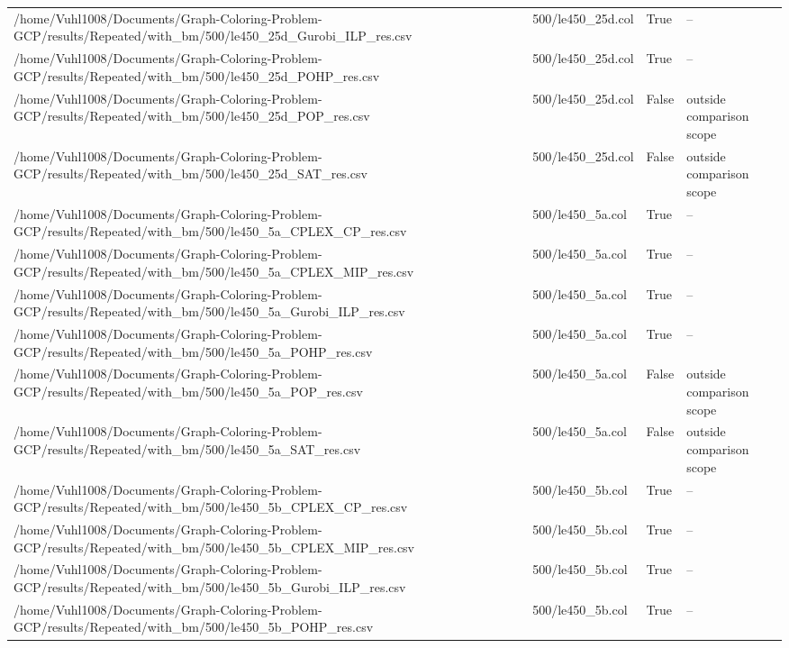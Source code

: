 \begin{table}[htbp]
\begin{tabular}{llll}
/home/Vuhl1008/Documents/Graph-Coloring-Problem-GCP/results/Repeated/with\_bm/500/le450\_25d\_Gurobi\_ILP\_res.csv & 500/le450\_25d.col & True & -- \\
/home/Vuhl1008/Documents/Graph-Coloring-Problem-GCP/results/Repeated/with\_bm/500/le450\_25d\_POHP\_res.csv & 500/le450\_25d.col & True & -- \\
/home/Vuhl1008/Documents/Graph-Coloring-Problem-GCP/results/Repeated/with\_bm/500/le450\_25d\_POP\_res.csv & 500/le450\_25d.col & False & outside comparison scope \\
/home/Vuhl1008/Documents/Graph-Coloring-Problem-GCP/results/Repeated/with\_bm/500/le450\_25d\_SAT\_res.csv & 500/le450\_25d.col & False & outside comparison scope \\
/home/Vuhl1008/Documents/Graph-Coloring-Problem-GCP/results/Repeated/with\_bm/500/le450\_5a\_CPLEX\_CP\_res.csv & 500/le450\_5a.col & True & -- \\
/home/Vuhl1008/Documents/Graph-Coloring-Problem-GCP/results/Repeated/with\_bm/500/le450\_5a\_CPLEX\_MIP\_res.csv & 500/le450\_5a.col & True & -- \\
/home/Vuhl1008/Documents/Graph-Coloring-Problem-GCP/results/Repeated/with\_bm/500/le450\_5a\_Gurobi\_ILP\_res.csv & 500/le450\_5a.col & True & -- \\
/home/Vuhl1008/Documents/Graph-Coloring-Problem-GCP/results/Repeated/with\_bm/500/le450\_5a\_POHP\_res.csv & 500/le450\_5a.col & True & -- \\
/home/Vuhl1008/Documents/Graph-Coloring-Problem-GCP/results/Repeated/with\_bm/500/le450\_5a\_POP\_res.csv & 500/le450\_5a.col & False & outside comparison scope \\
/home/Vuhl1008/Documents/Graph-Coloring-Problem-GCP/results/Repeated/with\_bm/500/le450\_5a\_SAT\_res.csv & 500/le450\_5a.col & False & outside comparison scope \\
/home/Vuhl1008/Documents/Graph-Coloring-Problem-GCP/results/Repeated/with\_bm/500/le450\_5b\_CPLEX\_CP\_res.csv & 500/le450\_5b.col & True & -- \\
/home/Vuhl1008/Documents/Graph-Coloring-Problem-GCP/results/Repeated/with\_bm/500/le450\_5b\_CPLEX\_MIP\_res.csv & 500/le450\_5b.col & True & -- \\
/home/Vuhl1008/Documents/Graph-Coloring-Problem-GCP/results/Repeated/with\_bm/500/le450\_5b\_Gurobi\_ILP\_res.csv & 500/le450\_5b.col & True & -- \\
/home/Vuhl1008/Documents/Graph-Coloring-Problem-GCP/results/Repeated/with\_bm/500/le450\_5b\_POHP\_res.csv & 500/le450\_5b.col & True & -- \\

\end{tabular}
\end{table}
